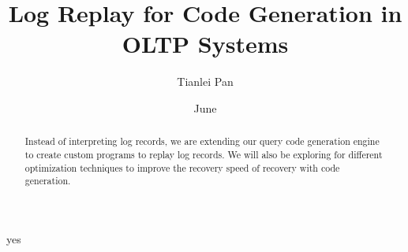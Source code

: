 \documentclass[12pt]{cmuthesis}
\begin{document}
 
\frontmatter

\pagestyle{empty}

\title{ %
{\bf Log Replay for Code Generation in OLTP Systems}}
\author{Tianlei Pan}
\date{June}
\trnumber{}


\support{}
\disclaimer{}



\maketitle

\begin{dedication}
\end{dedication}

\pagestyle{plain} %


\begin{abstract}
Instead of interpreting log records, we are extending our query code generation engine to create custom programs to replay log records. We will also be exploring for different optimization techniques to improve the recovery speed of recovery with code generation.
\end{abstract}

\begin{acknowledgments}
yes
\end{acknowledgments}



\tableofcontents
\listoffigures
\listoftables

\mainmatter


%
%
%
%
%
\end{document}

